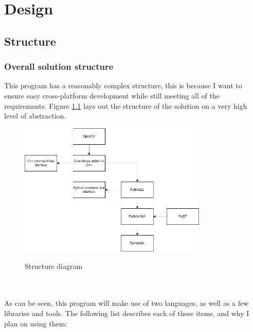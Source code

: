\documentclass[11pt]{report}
\begin{document}
\chapter{Design}
\thispagestyle{fancy}

\section{Structure}
\subsection{Overall solution structure}
This program has a reasonably complex structure, this is because I want to ensure easy cross-platform development while still meeting all of the requirements. Figure \ref{fig:structure} lays out the structure of the solution on a very high level of abstraction.
\begin{figure}[h!]
	\centering
	\caption{Structure diagram}
	\includegraphics[width=0.8\textwidth]{designDiagrams/structure}
	\label{fig:structure}
\end{figure}\\\\
As can be seen, this program will make use of two languages, as well as a few libraries and tools. The following list describes each of these items, and why I plan on using them:
\end{document}
